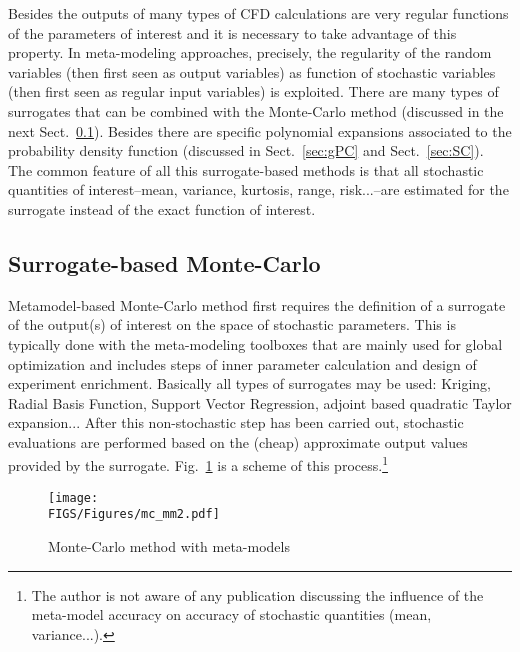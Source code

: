\documentclass{eurosae}
\newcommand{\sref}[1]{Sect.~\ref{#1}}
\newcommand{\fref}[1]{Fig.~\ref{#1}}
\begin{document}
 Besides the outputs of many types of CFD calculations are very regular functions of the parameters of interest and it is necessary
 to take advantage of this property. In meta-modeling approaches, precisely, the regularity of the random variables (then first seen as output variables) as function of stochastic
 variables (then first seen as regular input variables) is exploited. There are many types of surrogates that can be combined
 with the Monte-Carlo method (discussed in the next \sref{sec:MCsurr}). Besides there are specific polynomial expansions associated to the probability
 density function (discussed in \sref{sec:gPC} and \sref{sec:SC}). The common feature of all this surrogate-based methods is that all stochastic quantities of interest--mean, variance, kurtosis, range, risk...--are estimated for the surrogate instead of the exact function of interest.
%
\subsection{Surrogate-based Monte-Carlo}\label{sec:MCsurr}
%
Metamodel-based Monte-Carlo method first requires the definition of a surrogate of the output(s) of interest on the space of stochastic parameters.
 This is typically done with the meta-modeling toolboxes that are mainly used for global optimization and includes steps of inner parameter calculation and
 design of experiment enrichment. Basically all types of surrogates may be used: Kriging, Radial Basis Function, Support Vector Regression, adjoint based quadratic
  Taylor expansion... 
 After this non-stochastic step has been carried out, stochastic evaluations are performed based on the (cheap) approximate output values provided by the surrogate. \fref{f:metamc} is a scheme of this process.\footnote{The author is not aware of any publication discussing the influence of the meta-model accuracy on accuracy of stochastic quantities
  (mean, variance...). } 
%
\begin{figure}
\begin{center}
\texttt{[image: \\FIGS/Figures/mc\_mm2.pdf]}
\end{center}
\caption{Monte-Carlo method with meta-models}
\label{f:metamc}
\end{figure}
\end{document}
